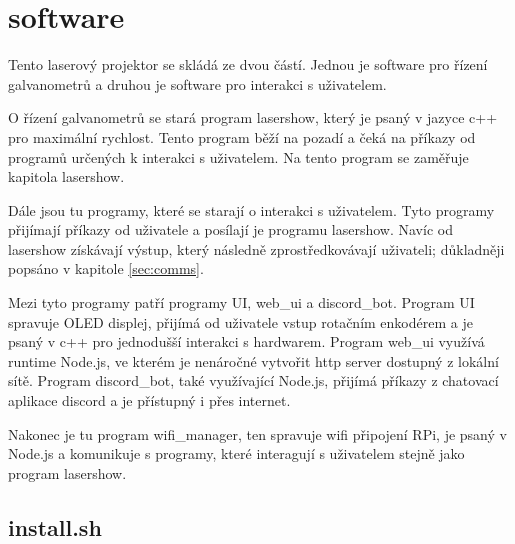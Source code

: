 \chapter{software}
Tento laserový projektor se skládá ze dvou částí. Jednou je software pro řízení galvanometrů a druhou je software pro interakci s uživatelem.

O řízení galvanometrů se stará program lasershow, který je psaný v jazyce c++ pro maximální rychlost. Tento program běží na pozadí a čeká na příkazy od programů určených k interakci s uživatelem. Na tento program se zaměřuje kapitola lasershow. 

Dále jsou tu programy, které se starají o interakci s uživatelem. Tyto programy přijímají příkazy od uživatele a posílají je programu lasershow. Navíc od lasershow získávají výstup, který následně zprostředkovávají uživateli; důkladněji popsáno v kapitole \ref{sec:comms}.

Mezi tyto programy patří programy UI, web\_ui a discord\_bot. Program UI spravuje OLED displej, přijímá od uživatele vstup rotačním enkodérem a je psaný v c++ pro jednodušší interakci s hardwarem. Program web\_ui využívá runtime Node.js, ve kterém je nenáročné vytvořit http server dostupný z lokální sítě.  Program discord\_bot, také využívající Node.js, přijímá příkazy z chatovací aplikace discord a je přístupný i přes internet.

Nakonec je tu program wifi\_manager, ten spravuje wifi připojení RPi, je psaný v Node.js a komunikuje s programy, které interagují s uživatelem stejně jako program lasershow.

\section{install.sh}





